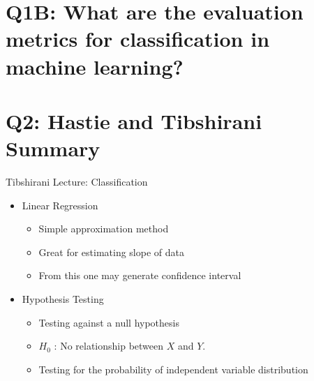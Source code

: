 \documentclass{beamer}
\begin{document}
\section[Q1.2]{Q1B: What are the evaluation metrics for classification in machine learning?}

\section[Q2]{Q2: Hastie and Tibshirani Summary}

\begin{frame}{Tibshirani Lecture: Classification}
\begin{itemize}
	\item<1-> Linear Regression
	\begin{itemize}
		\item<1-> Simple approximation method
		\item<1-> Great for estimating slope of data
		\item<1-> From this one may generate confidence interval
	\end{itemize}
	\item<2> Hypothesis Testing
	\begin{itemize}
		\item<2> Testing against a null hypothesis
		\item<2>[] $H_0$ : No relationship between $X$ and $Y$.
		\item<2> Testing for the probability of independent variable distribution 
	\end{itemize}
\end{itemize}
\end{frame}
\end{document}
